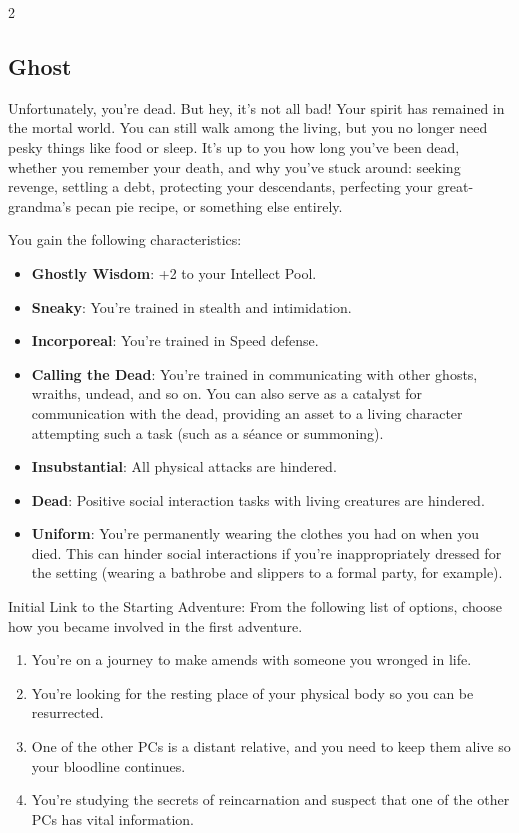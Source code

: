 \begin{multicols}{2}
\subsection{Ghost}

Unfortunately, you’re dead. But hey, it’s not all bad! Your spirit has remained in the mortal world. You can still walk among the living, but you no longer need pesky things like food or sleep. It’s up to you how long you’ve been dead, whether you remember your death, and why you’ve stuck around: seeking revenge, settling a debt, protecting your descendants, perfecting your great-grandma’s pecan pie recipe, or something else entirely.

You gain the following characteristics:

\begin{itemize}
\item \textbf{Ghostly Wisdom}: +2 to your Intellect Pool.
\item \textbf{Sneaky}: You’re trained in stealth and intimidation.
\item \textbf{Incorporeal}: You’re trained in Speed defense.
\item \textbf{Calling the Dead}: You’re trained in communicating with other ghosts, wraiths, undead, and so on. You can also serve as a catalyst for communication with the dead, providing an asset to a living character attempting such a task (such as a séance or summoning).
\item \textbf{Insubstantial}: All physical attacks are hindered.
\item \textbf{Dead}: Positive social interaction tasks with living creatures are hindered.
\item \textbf{Uniform}: You’re permanently wearing the clothes you had on when you died. This can hinder social interactions if you’re inappropriately dressed for the setting (wearing a bathrobe and slippers to a formal party, for example).
\end{itemize}

Initial Link to the Starting Adventure: From the following list of options, choose how you became involved in the first adventure.
\begin{enumerate}
\item You’re on a journey to make amends with someone you wronged in life.
\item You’re looking for the resting place of your physical body so you can be resurrected.
\item One of the other PCs is a distant relative, and you need to keep them alive so your bloodline continues.
\item You’re studying the secrets of reincarnation and suspect that one of the other PCs has vital information.
\end{enumerate}


\end{multicols}

